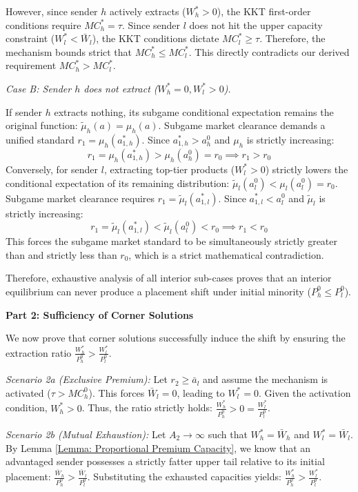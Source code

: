 \documentclass[12pt, a4paper]{article}
\begin{document}
However, since sender $h$ actively extracts ($W_h^* > 0$), the KKT first-order conditions require $MC_h^* = \tau$. Since sender $l$ does not hit the upper capacity constraint ($W_l^* < \bar{W}_l$), the KKT conditions dictate $MC_l^* \ge \tau$. Therefore, the mechanism bounds strict that $MC_h^* \le MC_l^*$. This directly contradicts our derived requirement $MC_h^* > MC_l^*$.

\textit{Case B: Sender $h$ does not extract ($W_h^* = 0, W_l^* > 0$).}

If sender $h$ extracts nothing, its subgame conditional expectation remains the original function: $\tilde{\mu}_h(a) = \mu_h(a)$. Subgame market clearance demands a unified standard $r_1 = \mu_h(a_{1,h}^*)$. Since $a_{1,h}^* > a_h^0$ and $\mu_h$ is strictly increasing:
$$r_1 = \mu_h(a_{1,h}^*) > \mu_h(a_h^0) = r_0 \implies r_1 > r_0$$
Conversely, for sender $l$, extracting top-tier products ($W_l^* > 0$) strictly lowers the conditional expectation of its remaining distribution: $\tilde{\mu}_l(a_l^0) < \mu_l(a_l^0) = r_0$. Subgame market clearance requires $r_1 = \tilde{\mu}_l(a_{1,l}^*)$. Since $a_{1,l}^* < a_l^0$ and $\tilde{\mu}_l$ is strictly increasing:
$$r_1 = \tilde{\mu}_l(a_{1,l}^*) < \tilde{\mu}_l(a_l^0) < r_0 \implies r_1 < r_0$$
This forces the subgame market standard to be simultaneously strictly greater than and strictly less than $r_0$, which is a strict mathematical contradiction.

Therefore, exhaustive analysis of all interior sub-cases proves that an interior equilibrium can never produce a placement shift under initial minority ($P_h^0 \le P_l^0$).

\textbf{Part 2: Sufficiency of Corner Solutions}

We now prove that corner solutions successfully induce the shift by ensuring the extraction ratio $\frac{W_h^*}{P_h^0} > \frac{W_l^*}{P_l^0}$.

\textit{Scenario 2a (Exclusive Premium):} Let $r_2 \ge \bar{a}_l$ and assume the mechanism is activated ($\tau > MC_h^0$). This forces $\bar{W}_l = 0$, leading to $W_l^* = 0$. Given the activation condition, $W_h^* > 0$. Thus, the ratio strictly holds: $\frac{W_h^*}{P_h^0} > 0 = \frac{W_l^*}{P_l^0}$.

\textit{Scenario 2b (Mutual Exhaustion):} Let $A_2 \to \infty$ such that $W_h^* = \bar{W}_h$ and $W_l^* = \bar{W}_l$. By Lemma \ref{Lemma: Proportional Premium Capacity}, we know that an advantaged sender possesses a strictly fatter upper tail relative to its initial placement: $\frac{\bar{W}_h}{P_h^0} > \frac{\bar{W}_l}{P_l^0}$. Substituting the exhausted capacities yields: $\frac{W_h^*}{P_h^0} > \frac{W_l^*}{P_l^0}$.
\end{document}
